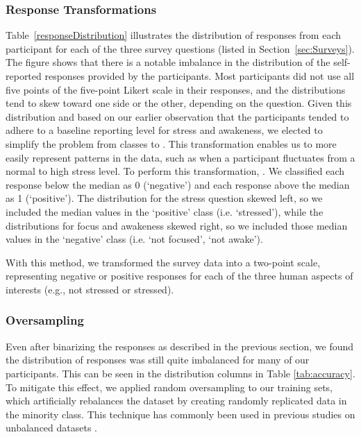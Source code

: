 \subsubsection{Response Transformations}
Table~\ref{responseDistribution} illustrates the distribution of responses from each participant for each of the three survey questions (listed in Section~\ref{sec:Surveys}). The figure shows that there is a notable imbalance in the distribution of the self-reported responses provided by the participants. Most participants did not use all five points of the five-point Likert scale in their responses, and the distributions tend to skew toward one side or the other, depending on the question. Given 
this distribution and based on our earlier observation that the participants tended to adhere to a baseline reporting level for stress and awakeness, we elected to simplify the problem from  classes to . This transformation enables us to more easily represent patterns in the data, such as when a participant fluctuates from a normal to high stress level. To perform this transformation, . We classified each response below the median as 0 (`negative') and each response above the median as 1 (`positive'). The distribution for the stress question skewed left, so we included the median values in the `positive' class (i.e. `stressed'), while the distributions for focus and awakeness skewed right, so we included those median values in the `negative' class (i.e. `not focused', `not awake').

With this method, we transformed the survey data into a two-point scale, representing  negative or positive responses for each of the three human aspects of interests (e.g., not stressed or stressed). 

\subsubsection{Oversampling}
Even after binarizing the responses as described in the previous section, we found the distribution of responses was still quite imbalanced for many of our participants. This can be seen in the distribution columns in Table \ref{tab:accuracy}. To mitigate this effect, we applied random oversampling to our training sets, which artificially rebalances the dataset by creating randomly replicated data in the minority class. This technique has commonly been used  in previous studies on unbalanced datasets \cite{chawla2004,yap2014}.


